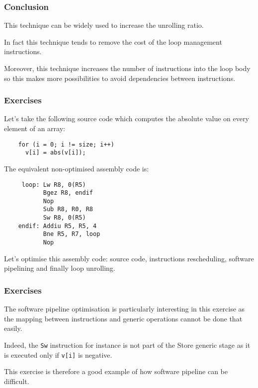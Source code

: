 
\begin{frame}
  \frametitle{Conclusion}

  This technique can be widely used to increase the unrolling ratio.

  \-

  In fact this technique tends to remove the cost of the loop management
  instructions.

  \-

  Moreover, this technique increases the number of instructions into the
  loop body so this makes more possibilities to avoid dependencies
  between instructions.
\end{frame}


\begin{frame}[containsverbatim]
  \frametitle{Exercises}

  Let's take the following source code which computes the absolute value
  on every element of an array:

  \begin{verbatim}
    for (i = 0; i != size; i++)
      v[i] = abs(v[i]);
  \end{verbatim}

  The equivalent non-optimised assembly code is:

  \begin{verbatim}
     loop: Lw R8, 0(R5)
           Bgez R8, endif
           Nop
           Sub R8, R0, R8
           Sw R8, 0(R5)
    endif: Addiu R5, R5, 4
           Bne R5, R7, loop
           Nop
  \end{verbatim}

  Let's optimise this assembly code: source code, instructions rescheduling,
  software pipelining and finally loop unrolling.
\end{frame}


\begin{frame}
  \frametitle{Exercises}

  The software pipeline optimisation is particularly interesting in this
  exercise as the mapping between instructions and generic operations cannot
  be done that easily.

  \-

  Indeed, the \texttt{Sw} instruction for instance is not part of the
  Store generic stage as it is executed only if \texttt{v[i]} is negative.

  \-

  This exercise is therefore a good example of how software pipeline can
  be difficult.
\end{frame}

